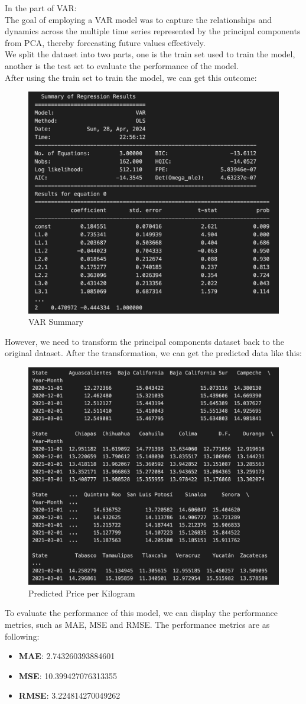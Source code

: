 \documentclass[12pt]{article}
\begin{document}
In the part of VAR:\\
The goal of employing a VAR model was to capture the relationships and dynamics across the multiple time series represented by the principal components from PCA, thereby forecasting future values effectively.\\

We split the dataset into two parts, one is the train set used to train the model, another is the test set to evaluate the performance of the model.\\
After using the train set to train the model, we can get this outcome:
\begin{figure}[H]
    \centering
    \includegraphics[width=0.5\linewidth]{VAR summary.png}
    \caption*{VAR Summary}
\end{figure}
However, we need to transform the principal components dataset back to the original dataset. After the transformation, we can get the predicted data like this:\\
\begin{figure}[H]
    \centering
    \includegraphics[width=0.5\linewidth]{Forecast.png}
    \caption*{Predicted Price per Kilogram}
\end{figure}
To evaluate the performance of this model, we can display the performance metrics, such as MAE, MSE and RMSE. The performance metrics are as following:
\begin{itemize}
    \item \textbf{MAE}: 2.743260393884601
    \item \textbf{MSE}: 10.399427076313355
    \item \textbf{RMSE}: 3.224814270049262
\end{itemize}
\end{document}
